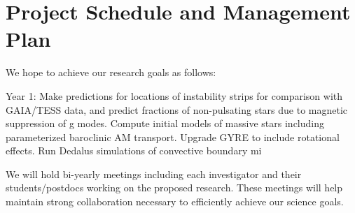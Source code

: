\section{Project Schedule and Management Plan}

We hope to achieve our research goals as follows:

Year 1: Make predictions for locations of instability strips for comparison with GAIA/TESS data, and predict fractions of non-pulsating stars due to magnetic suppression of g modes. Compute initial models of massive stars including parameterized baroclinic AM transport. Upgrade GYRE to include rotational effects. Run Dedalus simulations of convective boundary mi

We will  hold bi-yearly meetings including each investigator and their students/postdocs working on the proposed research. These meetings will help maintain strong collaboration necessary to efficiently achieve our science goals.
